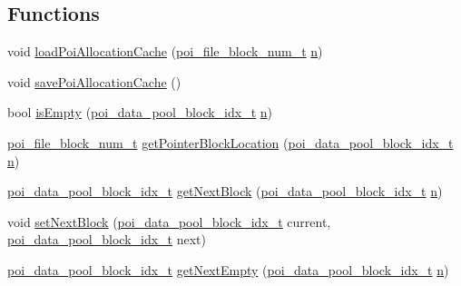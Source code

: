 \subsection*{Functions}
\begin{DoxyCompactItemize}
\item 
void \hyperlink{allocation-block-manager_8c_a2d77f886ffa0a0d025a6a521cc6cf294}{load\-Poi\-Allocation\-Cache} (\hyperlink{file-manager_8h_aef709af8fc6566dcaf55b656bb9f8881}{poi\-\_\-file\-\_\-block\-\_\-num\-\_\-t} \hyperlink{allocation-table-test_8c_a24010dade8ebab3f87a48022772cd975}{n})
\item 
void \hyperlink{allocation-block-manager_8c_aa62c7923af0be489b52b1dcdd7c04e23}{save\-Poi\-Allocation\-Cache} ()
\item 
bool \hyperlink{allocation-block-manager_8c_a4b553c2a61827a60738c9323e6082903}{is\-Empty} (\hyperlink{data-pool-block-manager_8h_a87e19ab8290bcd76be1c7db1e90cc6f6}{poi\-\_\-data\-\_\-pool\-\_\-block\-\_\-idx\-\_\-t} \hyperlink{allocation-table-test_8c_a24010dade8ebab3f87a48022772cd975}{n})
\item 
\hyperlink{file-manager_8h_aef709af8fc6566dcaf55b656bb9f8881}{poi\-\_\-file\-\_\-block\-\_\-num\-\_\-t} \hyperlink{allocation-block-manager_8c_a451dec2ee6d7a7241ab5fbc0a2ad0259}{get\-Pointer\-Block\-Location} (\hyperlink{data-pool-block-manager_8h_a87e19ab8290bcd76be1c7db1e90cc6f6}{poi\-\_\-data\-\_\-pool\-\_\-block\-\_\-idx\-\_\-t} \hyperlink{allocation-table-test_8c_a24010dade8ebab3f87a48022772cd975}{n})
\item 
\hyperlink{data-pool-block-manager_8h_a87e19ab8290bcd76be1c7db1e90cc6f6}{poi\-\_\-data\-\_\-pool\-\_\-block\-\_\-idx\-\_\-t} \hyperlink{allocation-block-manager_8c_a0843a74a7e1cc7c50dbfa521e4ea1cc8}{get\-Next\-Block} (\hyperlink{data-pool-block-manager_8h_a87e19ab8290bcd76be1c7db1e90cc6f6}{poi\-\_\-data\-\_\-pool\-\_\-block\-\_\-idx\-\_\-t} \hyperlink{allocation-table-test_8c_a24010dade8ebab3f87a48022772cd975}{n})
\item 
void \hyperlink{allocation-block-manager_8c_a7387272862663d2af1af9d5c21cddc84}{set\-Next\-Block} (\hyperlink{data-pool-block-manager_8h_a87e19ab8290bcd76be1c7db1e90cc6f6}{poi\-\_\-data\-\_\-pool\-\_\-block\-\_\-idx\-\_\-t} current, \hyperlink{data-pool-block-manager_8h_a87e19ab8290bcd76be1c7db1e90cc6f6}{poi\-\_\-data\-\_\-pool\-\_\-block\-\_\-idx\-\_\-t} next)
\item 
\hyperlink{data-pool-block-manager_8h_a87e19ab8290bcd76be1c7db1e90cc6f6}{poi\-\_\-data\-\_\-pool\-\_\-block\-\_\-idx\-\_\-t} \hyperlink{allocation-block-manager_8c_ab352dc84382d70f0044e92c52165c2cc}{get\-Next\-Empty} (\hyperlink{data-pool-block-manager_8h_a87e19ab8290bcd76be1c7db1e90cc6f6}{poi\-\_\-data\-\_\-pool\-\_\-block\-\_\-idx\-\_\-t} \hyperlink{allocation-table-test_8c_a24010dade8ebab3f87a48022772cd975}{n})
\end{DoxyCompactItemize}
